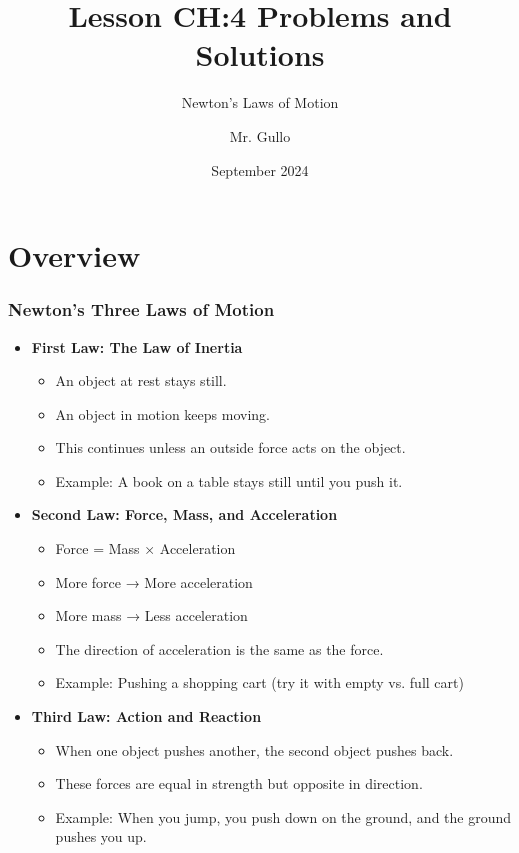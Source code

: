 \documentclass{beamer}
\title{Lesson CH:4 Problems and Solutions}
\subtitle{Newton's Laws of Motion}
\author{Mr. Gullo}
\date{September 2024}
\begin{document}
\frame{\titlepage}

\section{Overview}

\begin{frame}
\frametitle{Newton's Three Laws of Motion}
\begin{itemize}
    \item \textbf{First Law: The Law of Inertia}
    \begin{itemize}
        \item An object at rest stays still.
        \item An object in motion keeps moving.
        \item This continues unless an outside force acts on the object.
        \item Example: A book on a table stays still until you push it.
    \end{itemize}
    
    \item \textbf{Second Law: Force, Mass, and Acceleration}
    \begin{itemize}
        \item Force = Mass × Acceleration
        \item More force → More acceleration
        \item More mass → Less acceleration
        \item The direction of acceleration is the same as the force.
        \item Example: Pushing a shopping cart (try it with empty vs. full cart)
    \end{itemize}
    
    \item \textbf{Third Law: Action and Reaction}
    \begin{itemize}
        \item When one object pushes another, the second object pushes back.
        \item These forces are equal in strength but opposite in direction.
        \item Example: When you jump, you push down on the ground, and the ground pushes you up.
    \end{itemize}
\end{itemize}
\end{frame}
\end{document}
